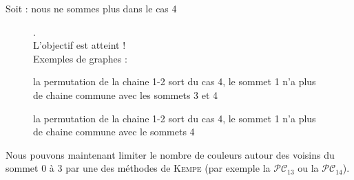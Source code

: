\begin{adjustwidth}{3.5em}{0pt}
\begin{description}
\item[Soit : nous ne sommes plus dans le cas 4].\\
L’objectif est atteint !\\
Exemples de graphes :
\end{description}
\FloatBarrier
\begin{figure}[!ht]\centering
	\begin{changemargin}{-3cm}{-3cm}
		\begin{center}
			
			\hspace{15pt}
			
		\end{center}
		\end{changemargin}
	\begin{changemargin}{3cm}{0cm}
	\caption{la permutation de la chaine 1-2 sort du cas 4, le sommet 1 n'a plus de chaine commune avec les sommets 3 et 4}\label{fig:cas4_etape1_4}
\end{changemargin}	
\end{figure}	
\FloatBarrier
\begin{figure}[!ht]\centering
	\begin{changemargin}{0cm}{-3cm}
		\begin{center}
			
			\hspace{15pt}
			
		\end{center}
	\end{changemargin}
	\begin{changemargin}{3cm}{0cm}
	\caption{la permutation de la chaine 1-2 sort du cas 4, le sommet 1 n'a plus de chaine commune avec le sommets 4}\label{fig:cas4_etape1_5}
	\end{changemargin}
\end{figure}	
\FloatBarrier
Nous pouvons maintenant limiter le nombre de couleurs autour des voisins du sommet 0 à 3 par une des méthodes de \textsc{Kempe} (par exemple la $\mathcal{PC}_{13}$ ou la $\mathcal{PC}_{14}$).\\
\end{adjustwidth}

